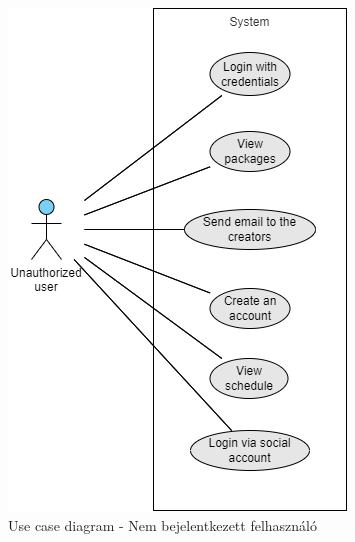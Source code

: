 \begin{figure}[!h]
	\centering
	\includegraphics[scale=0.7]{images/useCaseNA}
	\caption{Use case diagram - Nem bejelentkezett felhasználó}
	\label{abra:useCaseNA}
\end{figure}

